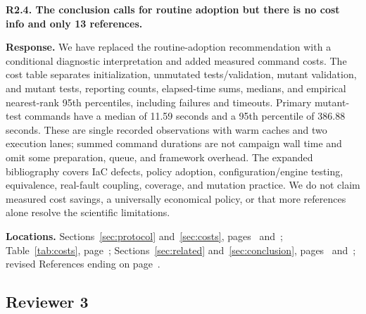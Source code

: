 \medskip
\noindent\textbf{R2.4. The conclusion calls for routine adoption but there is no cost info and only 13 references.}\label{response:R2.4}\par
\textbf{Response.} We have replaced the routine-adoption recommendation with a conditional diagnostic interpretation and added measured command costs. The cost table separates initialization, unmutated tests/validation, mutant validation, and mutant tests, reporting counts, elapsed-time sums, medians, and empirical nearest-rank 95th percentiles, including failures and timeouts. Primary mutant-test commands have a median of 11.59 seconds and a 95th percentile of 386.88 seconds. These are single recorded observations with warm caches and two execution lanes; summed command durations are not campaign wall time and omit some preparation, queue, and framework overhead. The expanded bibliography covers IaC defects, policy adoption, configuration/engine testing, equivalence, real-fault coupling, coverage, and mutation practice. We do not claim measured cost savings, a universally economical policy, or that more references alone resolve the scientific limitations.\par
\textbf{Locations.} Sections~\ref{sec:protocol} and~\ref{sec:costs}, pages~\pageref{sec:protocol} and~\pageref{sec:costs}; Table~\ref{tab:costs}, page~\pageref{tab:costs}; Sections~\ref{sec:related} and~\ref{sec:conclusion}, pages~\pageref{sec:related} and~\pageref{sec:conclusion}; revised References ending on page~\pageref{lastmanuscriptpage}.

\subsection*{Reviewer 3}

